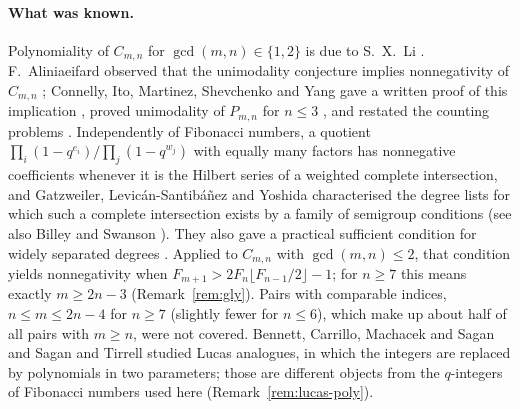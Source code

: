 \documentclass[11pt,a4paper]{article}
\theoremstyle{definition}\newtheorem{definition}[theorem]{Definition}
\theoremstyle{remark}\newtheorem{remark}[theorem]{Remark}\newtheorem{example}[theorem]{Example}
\numberwithin{equation}{section}
\begin{document}
\paragraph{What was known.}
Polynomiality of $C_{m,n}$ for $\gcd(m,n)\in\{1,2\}$ is due to S.~X.~Li \cite[Prop.~4.2]{bck}. F.~Aliniaeifard observed that the unimodality conjecture implies nonnegativity of $C_{m,n}$ \cite[Remark~4.4]{bck}; Connelly, Ito, Martinez, Shevchenko and Yang gave a written proof of this implication \cite[Prop.~5.6]{connelly}, proved unimodality of $P_{m,n}$ for $n\le3$ \cite[Thm.~1.2]{connelly}, and restated the counting problems \cite[Problems~5.7--5.8]{connelly}. Independently of Fibonacci numbers, a quotient $\prod_i(1-q^{e_i})/\prod_j(1-q^{w_j})$ with equally many factors has nonnegative coefficients whenever it is the Hilbert series of a weighted complete intersection, and Gatzweiler, Levic\'an-Santib\'a\~nez and Yoshida \cite[Prop.~3.3]{gly} characterised the degree lists for which such a complete intersection exists by a family of semigroup conditions (see also Billey and Swanson \cite[\S6.3]{billey}). They also gave a practical sufficient condition for widely separated degrees \cite[Thm.~3.9]{gly}. Applied to $C_{m,n}$ with $\gcd(m,n)\le2$, that condition yields nonnegativity when $F_{m+1}>2F_n\lfloor F_{n-1}/2\rfloor-1$; for $n\ge7$ this means exactly $m\ge 2n-3$ (Remark~\ref{rem:gly}). Pairs with comparable indices, $n\le m\le 2n-4$ for $n\ge7$ (slightly fewer for $n\le6$), which make up about half of all pairs with $m\ge n$, were not covered. Bennett, Carrillo, Machacek and Sagan \cite{bcms} and Sagan and Tirrell \cite{st} studied Lucas analogues, in which the integers are replaced by polynomials in two parameters; those are different objects from the $q$-integers of Fibonacci numbers used here (Remark~\ref{rem:lucas-poly}).
\end{document}
